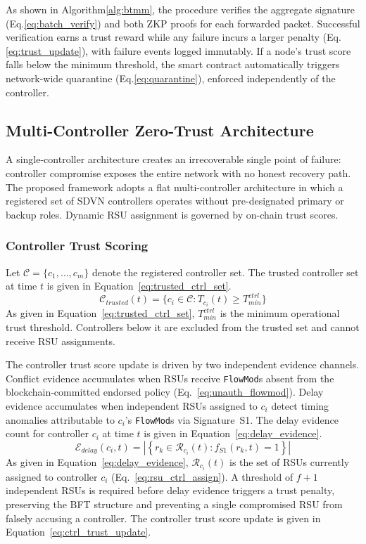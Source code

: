 \documentclass[12pt, a4paper]{report}
\begin{document}
{{As shown in Algorithm\ref{alg:btmm}, the procedure verifies the
aggregate signature (Eq.\ref{eq:batch_verify}) and both ZKP proofs
for each forwarded packet. Successful verification earns a trust
reward while any failure incurs a larger penalty
(Eq.\ref{eq:trust_update}), with failure events logged immutably.
If a node's trust score falls below the minimum threshold, the
smart contract automatically triggers network-wide quarantine
(Eq.\ref{eq:quarantine}), enforced independently of the
controller.

\subsection{Multi-Controller Zero-Trust Architecture}
\label{sec:multi_ctrl}


A single-controller architecture creates an irrecoverable
single point of failure: controller compromise exposes the
entire network with no honest recovery path. The proposed
framework adopts a flat multi-controller architecture in
which a registered set of \ac{SDVN} controllers operates
without pre-designated primary or backup roles. Dynamic
\ac{RSU} assignment is governed by on-chain trust scores.



\subsubsection{Controller Trust Scoring}
Let $\mathcal{C}{=}\{c_1,\ldots,c_m\}$ denote the
registered controller set. The trusted controller set
at time $t$ is given in
Equation~\eqref{eq:trusted_ctrl_set}.
\begin{equation}
\mathcal{C}_{trusted}(t){=}
\{c_i\in\mathcal{C}:T_{c_i}(t)\geq T_{min}^{ctrl}\}
\label{eq:trusted_ctrl_set}
\end{equation}
As given in Equation~\eqref{eq:trusted_ctrl_set},
$T_{min}^{ctrl}$ is the minimum operational trust
threshold. Controllers below it are excluded from the
trusted set and cannot receive \ac{RSU} assignments.


The controller trust score update is driven by two
independent evidence channels. Conflict evidence
accumulates when RSUs receive \texttt{FlowMod}s absent
from the blockchain-committed endorsed policy
(Eq.~\ref{eq:unauth_flowmod}). Delay evidence
accumulates when independent RSUs assigned to $c_i$
detect timing anomalies attributable to $c_i$'s
\texttt{FlowMod}s via Signature~S1. The delay
evidence count for controller $c_i$ at time $t$ is
given in Equation~\eqref{eq:delay_evidence}.
\begin{equation}
\mathcal{E}_{delay}(c_i,t) =
\left|\left\{
r_k \in \mathcal{R}_{c_i}(t) :
f_{S1}(r_k,t) = 1
\right\}\right|
\label{eq:delay_evidence}
\end{equation}
As given in Equation~\eqref{eq:delay_evidence},
$\mathcal{R}_{c_i}(t)$ is the set of \ac{RSU}s
currently assigned to controller $c_i$
(Eq.~\ref{eq:rsu_ctrl_assign}). A threshold of
$f{+}1$ independent \ac{RSU}s is required before
delay evidence triggers a trust penalty, preserving
the \ac{BFT} structure and preventing a single
compromised \ac{RSU} from falsely accusing a
controller. The controller trust score update is
given in Equation~\eqref{eq:ctrl_trust_update}.


}}
\end{document}
